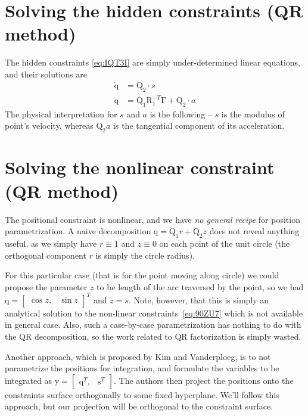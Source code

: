 \documentclass{scrartcl}
\newcommand\mMat[1]{\ensuremath{\boldsymbol{\mathrm{#1}}}}
\newcommand\mVec[1]{\ensuremath{\boldsymbol{\mathrm{#1}}}}
\begin{document}
\section{Solving the hidden constraints (QR method)}

The hidden constraints \eqref{eq:IQT3I} are simply under-determined linear
equations, and their solutions are
\begin{align}
  \mVec{\dot q}   & = \mMat{Q}_2 \cdot s
  \label{eq:38DY7}
  \\
  \mVec{\ddot q}  & = \mMat{Q}_1 \mMat{R}_1^{-T} \mVec{\Gamma}
                    + \mMat{Q}_2 \cdot a
  \label{eq:EKLKN}
\end{align}
The physical interpretation for $s$ and $a$ is the following -- $s$ is the
modulus of point's velocity, whereas $\mMat{Q}_2 a$ is the tangential component
of its acceleration.

\section{Solving the nonlinear constraint (QR method)}

The positional constraint is nonlinear, and we have \textit{no general recipe}
for position parametrization. A naive decomposition $\mVec{q} = \mMat{Q}_1 r +
\mMat{Q}_2 z$ does not reveal anything useful, as we simply have $r \equiv 1$
and $z \equiv 0$ on each point of the unit circle (the orthogonal component $r$
is simply the circle radius).

For this particular case (that is for the point moving along circle) we could
propose the parameter $z$ to be length of the arc traversed by the point, so we
had $\mVec{q} = \begin{bmatrix} \cos{z}, & \sin{z} \end{bmatrix}^T$
and ${\dot z} = s$. Note, however, that this is simply an analytical solution
to the non-linear constraints~\eqref{eq:90ZU7} which is not available in
general case. Also, such a case-by-case parametrization has nothing to do with
the QR decomposition, so the work related to QR factorization is simply wasted.

Another approach, which is proposed by Kim and Vanderploeg, is to not
para\-me\-tri\-ze the positions for integration, and formulate the variables to
be integrated as $\mVec{y} = \begin{bmatrix} \mVec{q}^T, & \mVec{s}^T
\end{bmatrix}$. The authors then project the positions onto the constraints
surface orthogonally to some fixed hyperplane. We'll follow this approach, but
our projection will be orthogonal to the constraint surface.
\end{document}
